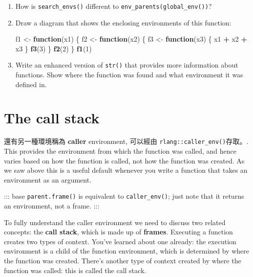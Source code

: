 \documentclass[]{book}
\newenvironment{Shaded}{\begin{snugshade}}{\end{snugshade}}
\newcommand{\KeywordTok}[1]{\textcolor[rgb]{0.13,0.29,0.53}{\textbf{#1}}}
\newcommand{\DecValTok}[1]{\textcolor[rgb]{0.00,0.00,0.81}{#1}}
\newcommand{\StringTok}[1]{\textcolor[rgb]{0.31,0.60,0.02}{#1}}
\newcommand{\ControlFlowTok}[1]{\textcolor[rgb]{0.13,0.29,0.53}{\textbf{#1}}}
\newcommand{\OperatorTok}[1]{\textcolor[rgb]{0.81,0.36,0.00}{\textbf{#1}}}
\newcommand{\NormalTok}[1]{#1}
\theoremstyle{definition}
\theoremstyle{definition}
\theoremstyle{definition}
\theoremstyle{remark}
\begin{document}
\begin{enumerate}
\def\labelenumi{\arabic{enumi}.}
\item
  How is \texttt{search\_envs()} different to
  \texttt{env\_parents(global\_env())}?
\item
  Draw a diagram that shows the enclosing environments of this function:

\begin{Shaded}
\begin{Highlighting}[]
\NormalTok{f1 <-}\StringTok{ }\ControlFlowTok{function}\NormalTok{(x1) \{}
\NormalTok{  f2 <-}\StringTok{ }\ControlFlowTok{function}\NormalTok{(x2) \{}
\NormalTok{    f3 <-}\StringTok{ }\ControlFlowTok{function}\NormalTok{(x3) \{}
\NormalTok{      x1 }\OperatorTok{+}\StringTok{ }\NormalTok{x2 }\OperatorTok{+}\StringTok{ }\NormalTok{x3}
\NormalTok{    \}}
    \KeywordTok{f3}\NormalTok{(}\DecValTok{3}\NormalTok{)}
\NormalTok{  \}}
  \KeywordTok{f2}\NormalTok{(}\DecValTok{2}\NormalTok{)}
\NormalTok{\}}
\KeywordTok{f1}\NormalTok{(}\DecValTok{1}\NormalTok{)}
\end{Highlighting}
\end{Shaded}
\item
  Write an enhanced version of \texttt{str()} that provides more
  information about functions. Show where the function was found and
  what environment it was defined in.
\end{enumerate}

\section{The call stack}\label{the-call-stack}

還有另一種環境稱為 \textbf{caller} environment, 可以經由
\texttt{rlang::caller\_env()}存取。. This provides the environment from
which the function was called, and hence varies based on how the
function is called, not how the function was created. As we saw above
this is a useful default whenever you write a function that takes an
environment as an argument.

::: base \texttt{parent.frame()} is equivalent to
\texttt{caller\_env()}; just note that it returns an environment, not a
frame. :::

To fully understand the caller environment we need to discuss two
related concepts: the \textbf{call stack}, which is made up of
\textbf{frames}. Executing a function creates two types of context.
You've learned about one already: the execution environment is a child
of the function environment, which is determined by where the function
was created. There's another type of context created by where the
function was called: this is called the call stack.
\end{document}
